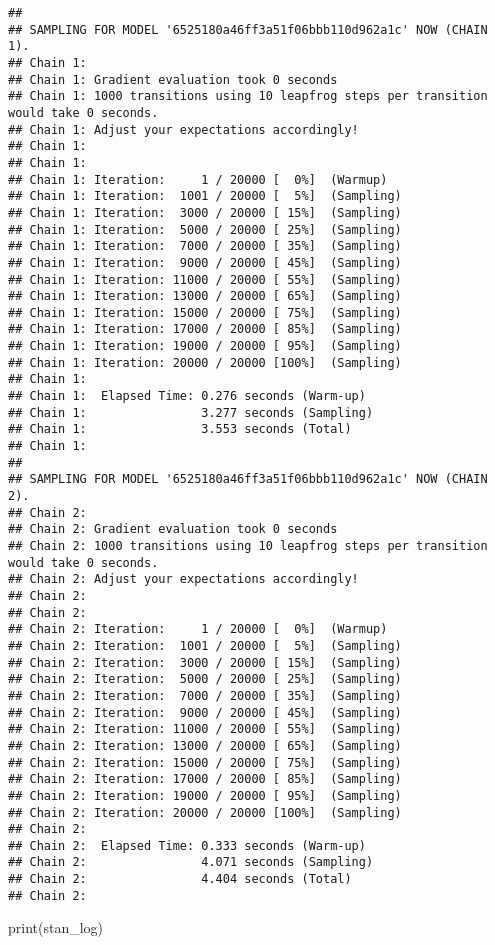 \documentclass[
]{book}
\newenvironment{Shaded}{\begin{snugshade}}{\end{snugshade}}
\newcommand{\FunctionTok}[1]{\textcolor[rgb]{0.00,0.00,0.00}{#1}}
\newcommand{\NormalTok}[1]{#1}
\begin{document}
\begin{verbatim}
## 
## SAMPLING FOR MODEL '6525180a46ff3a51f06bbb110d962a1c' NOW (CHAIN 1).
## Chain 1: 
## Chain 1: Gradient evaluation took 0 seconds
## Chain 1: 1000 transitions using 10 leapfrog steps per transition would take 0 seconds.
## Chain 1: Adjust your expectations accordingly!
## Chain 1: 
## Chain 1: 
## Chain 1: Iteration:     1 / 20000 [  0%]  (Warmup)
## Chain 1: Iteration:  1001 / 20000 [  5%]  (Sampling)
## Chain 1: Iteration:  3000 / 20000 [ 15%]  (Sampling)
## Chain 1: Iteration:  5000 / 20000 [ 25%]  (Sampling)
## Chain 1: Iteration:  7000 / 20000 [ 35%]  (Sampling)
## Chain 1: Iteration:  9000 / 20000 [ 45%]  (Sampling)
## Chain 1: Iteration: 11000 / 20000 [ 55%]  (Sampling)
## Chain 1: Iteration: 13000 / 20000 [ 65%]  (Sampling)
## Chain 1: Iteration: 15000 / 20000 [ 75%]  (Sampling)
## Chain 1: Iteration: 17000 / 20000 [ 85%]  (Sampling)
## Chain 1: Iteration: 19000 / 20000 [ 95%]  (Sampling)
## Chain 1: Iteration: 20000 / 20000 [100%]  (Sampling)
## Chain 1: 
## Chain 1:  Elapsed Time: 0.276 seconds (Warm-up)
## Chain 1:                3.277 seconds (Sampling)
## Chain 1:                3.553 seconds (Total)
## Chain 1: 
## 
## SAMPLING FOR MODEL '6525180a46ff3a51f06bbb110d962a1c' NOW (CHAIN 2).
## Chain 2: 
## Chain 2: Gradient evaluation took 0 seconds
## Chain 2: 1000 transitions using 10 leapfrog steps per transition would take 0 seconds.
## Chain 2: Adjust your expectations accordingly!
## Chain 2: 
## Chain 2: 
## Chain 2: Iteration:     1 / 20000 [  0%]  (Warmup)
## Chain 2: Iteration:  1001 / 20000 [  5%]  (Sampling)
## Chain 2: Iteration:  3000 / 20000 [ 15%]  (Sampling)
## Chain 2: Iteration:  5000 / 20000 [ 25%]  (Sampling)
## Chain 2: Iteration:  7000 / 20000 [ 35%]  (Sampling)
## Chain 2: Iteration:  9000 / 20000 [ 45%]  (Sampling)
## Chain 2: Iteration: 11000 / 20000 [ 55%]  (Sampling)
## Chain 2: Iteration: 13000 / 20000 [ 65%]  (Sampling)
## Chain 2: Iteration: 15000 / 20000 [ 75%]  (Sampling)
## Chain 2: Iteration: 17000 / 20000 [ 85%]  (Sampling)
## Chain 2: Iteration: 19000 / 20000 [ 95%]  (Sampling)
## Chain 2: Iteration: 20000 / 20000 [100%]  (Sampling)
## Chain 2: 
## Chain 2:  Elapsed Time: 0.333 seconds (Warm-up)
## Chain 2:                4.071 seconds (Sampling)
## Chain 2:                4.404 seconds (Total)
## Chain 2:
\end{verbatim}

\begin{Shaded}
\begin{Highlighting}[]
\FunctionTok{print}\NormalTok{(stan\_log)}
\end{Highlighting}
\end{Shaded}
\end{document}
